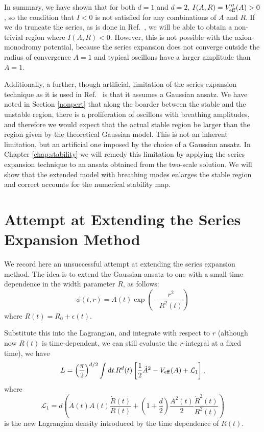 \documentclass[11pt]{book}
\begin{document}
\bigbreak

In summary, we have shown that for both $d=1$ and $d=2$, $I(A,R) = V''_{\rm eff}(A) > 0$, so the condition that $I<0$ is not satisfied for any combinations of $A$ and $R$. If we do truncate the series, as is done in Ref.~\cite{Gleiser:2008ty}, we will be able to obtain a non-trivial region where $I(A,R)<0$. However, this is not possible with the axion-monodromy potential, because the series expansion does not converge outside the radius of convergence $A = 1$ and typical oscillons have a larger amplitude than $A=1$.

\medbreak
Additionally, a further, though artificial, limitation of the series expansion technique as it is used in Ref.~\cite{Gleiser:2008ty} is that it assumes a Gaussian ansatz. We have noted in Section \ref{nonpert} that along the boarder between the stable and the unstable region, there is a proliferation of oscillons with breathing amplitudes, and therefore we would expect that the actual stable region be larger than the region given by the theoretical Gaussian model. This is not an inherent limitation, but an artificial one imposed by the choice of a Gaussian ansatz. In Chapter \ref{chap:stability} we will remedy this limitation by applying the series expansion technique to an ansatz obtained from the two-scale solution. We will show that the extended model with breathing modes enlarges the stable region and correct accounts for the numerical stability map.

\section{Attempt at Extending the Series Expansion Method}
We record here an unsuccessful attempt at extending the series expansion method. The idea is to extend the Gaussian ansatz to one with a small time dependence in the width parameter $R$, as follows:
\begin{equation}\label{wrongansatz}
  \phi(t,r) = A(t) \exp \left(-\frac{r^2}{R^2(t)}\right )
\end{equation}
where $R(t) = R_0 + \epsilon(t)$.

Substitute this into the Lagrangian, and integrate with respect to $r$ (although now $R(t)$ is time-dependent, we can still evaluate the $r$-integral at a fixed time), we have
\begin{equation}
 L = \left(\frac{\pi}{2}\right)^{d/2}\int {\rm d}t\, R^d(t) \left[ \frac{1}{2}\dot{A}^2 - V_{\rm eff} (A) +
    \mathcal{L}_1\right],
\end{equation}
where
\begin{equation}
  \mathcal{L}_1 = d\left( \dot{A}(t)A(t)\frac{\dot{R}(t)}{R(t)} +\left(1+\frac{d}{2}\right)\frac{A^2(t)}{2}\frac{\dot{R}^2(t)}{R^2(t)}\right)
\end{equation}
is the new Lagrangian density introduced by the time dependence of $R(t)$.
\end{document}
